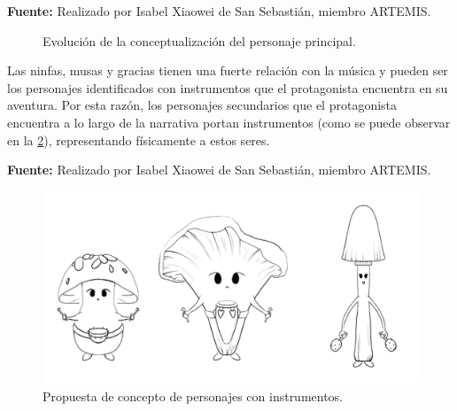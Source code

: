 \begin{center}
	\textbf{Fuente:} Realizado por Isabel Xiaowei de San Sebastián, miembro ARTEMIS.
	\vspace{-18pt}
\end{center}

\begin{figure}[h!]
	\centering
	\hfil
	\caption{Evolución de la conceptualización del personaje principal.}
	\label{fig:MainCharacter}
\end{figure}

Las ninfas, musas y gracias tienen una fuerte relación con la música y pueden ser los personajes identificados con instrumentos que el protagonista encuentra en su aventura. Por esta razón, los personajes secundarios que el protagonista encuentra a lo largo de la narrativa portan instrumentos (como se puede observar en la \ref{fig:InstrumentCharacters}), representando físicamente a estos seres.

\begin{center}
	\textbf{Fuente:} Realizado por Isabel Xiaowei de San Sebastián, miembro ARTEMIS.
	\vspace{-18pt}
\end{center}

\begin{figure}[h!]
	\centering
	\includegraphics[width=0.3\linewidth]{Figuras/Desarrollo/InstrumentCharacters}
	\caption{Propuesta de concepto de personajes con instrumentos.}
	\label{fig:InstrumentCharacters}
\end{figure}

